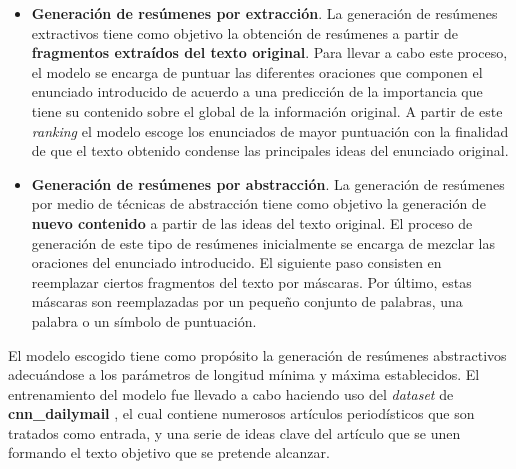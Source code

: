 \begin{itemize} [\textbullet]
    \item \textbf{Generación de resúmenes por extracción}. La generación de resúmenes extractivos tiene como objetivo la obtención de resúmenes a partir de \textbf{fragmentos extraídos del texto original}. Para llevar a cabo este proceso, el modelo se encarga de puntuar las diferentes oraciones que componen el enunciado introducido de acuerdo a una predicción de la importancia que tiene su contenido sobre el global de la información original. A partir de este \emph{ranking} el modelo escoge los enunciados de mayor puntuación con la finalidad de que el texto obtenido condense las principales ideas del enunciado original.
    
    \item \textbf{Generación de resúmenes por abstracción}. La generación de resúmenes por medio de técnicas de abstracción tiene como objetivo la generación de \textbf{nuevo contenido} a partir de las ideas del texto original. El proceso de generación de este tipo de resúmenes inicialmente se encarga de mezclar las oraciones del enunciado introducido. El siguiente paso consisten en reemplazar ciertos fragmentos del texto por máscaras. Por último, estas máscaras son reemplazadas por un pequeño conjunto de palabras, una palabra o un símbolo de puntuación.
\end{itemize}

El modelo escogido tiene como propósito la generación de resúmenes abstractivos adecuándose a los parámetros de longitud mínima y máxima establecidos. El entrenamiento del modelo fue llevado a cabo haciendo uso del \emph{dataset} de \textbf{cnn\_dailymail} \cite{ct:dailymail}, el cual contiene numerosos artículos periodísticos que son tratados como entrada, y una serie de ideas clave del artículo que se unen formando el texto objetivo que se pretende alcanzar.
